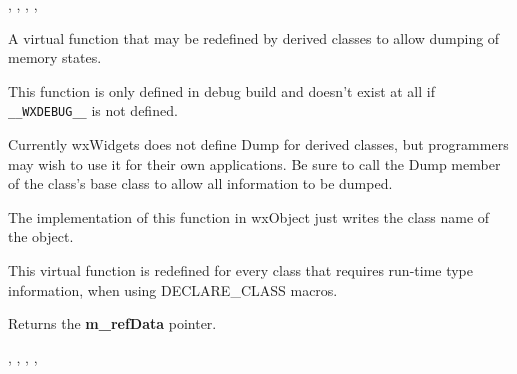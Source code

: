 
, ,\rtfsp
{},\rtfsp
{},\rtfsp
{}

\label{wxobjectdump}


A virtual function that may be redefined by derived classes to allow dumping of
memory states.

This function is only defined in debug build and doesn't exist at all if
{\tt \_\_WXDEBUG\_\_} is not defined.




Currently wxWidgets does not define Dump for derived classes, but
programmers may wish to use it for their own applications. Be sure to
call the Dump member of the class's base class to allow all information to be
dumped.

The implementation of this function in wxObject just writes the class name of
the object.

\label{wxobjectgetclassinfo}


This virtual function is redefined for every class that requires run-time
type information, when using DECLARE\_CLASS macros.

\label{wxobjectgetrefdata}


Returns the {\bf m\_refData} pointer.


, , ,\rtfsp
{},\rtfsp
{}

\label{wxobjectiskindof}


